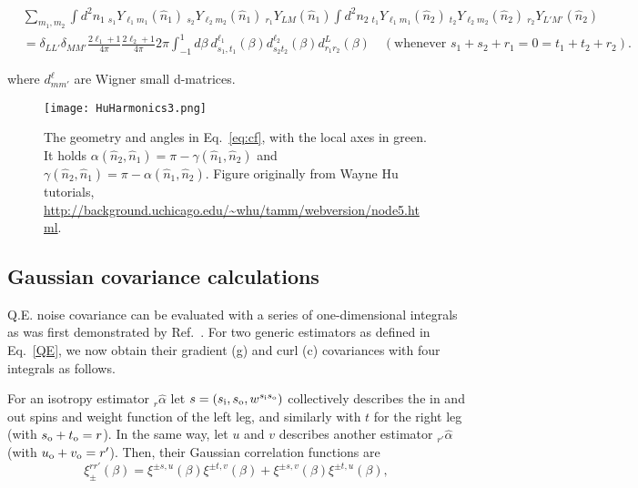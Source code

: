 \documentclass[reprint,prd, superscriptaddress, tightenlines, longbibliography, nofootinbib, eqsecnum, amsfonts, amsmath, floatfix, notitlepage, twocolumn]{revtex4-1}
\newcommand{\si}[0]{{s_{\rm i}}}
\newcommand{\so}[0]{{s_{\rm o}}}
\renewcommand{\to}[0]{{t_{\rm o}}}
\newcommand{\uo}[0]{{u_{\rm o}}}
\newcommand{\vo}[0]{{v_{\rm o}}}
\newcommand{\av}[1]{\left\langle #1 \right\rangle}
\newcommand{\hn}[0]{\hat n}
\begin{document}
\begin{widetext}
\begin{equation}
\begin{split}
&\sum_{m_1,m_2}\int d^2n_1\:_{s_1} Y_{\ell_1 m_1}(\hn_1)\:_{s_2} Y_{\ell_2 m_2}(\hn_1)\:_{r_1} Y_{L M}(\hn_1)\int d^2n_2\:_{t_1} Y_{\ell_1 m_1}(\hn_2)\:_{t_2} Y_{\ell_2 m_2}(\hn_2)\:_{r_2} Y_{L' M'}(\hn_2)  \\&= \delta_{LL'}\delta_{MM'}\frac{2\ell_1 + 1}{4\pi}\frac{2\ell_2 + 1} {4\pi} 2\pi \int_{-1}^{1} d\beta \: d^{\ell_1}_{s_1,t_1}(\beta)d^{\ell_2}_{s_2 t_2}(\beta)d^{L}_{r_1 r_2}(\beta) \quad (\textrm{whenever } s_1 + s_2 + r_1  = 0 = t_1 + t_2 + r_2).
\end{split}
\end{equation}
\end{widetext}
where $d^\ell_{mm'}$ are Wigner small d-matrices.
\begin{figure}[h]
	\texttt{[image: HuHarmonics3.png]}
	\caption{\label{fig:geometry}The geometry and angles in Eq.~\eqref{eq:cf}, with the local axes in green. It holds $\alpha(\hn_2, \hn_1) = \pi - \gamma(\hn_1, \hn_2)$ and $ \gamma(\hn_2, \hn_1) = \pi - \alpha(\hn_1, \hn_2)$. Figure originally from Wayne Hu tutorials, \url{http://background.uchicago.edu/~whu/tamm/webversion/node5.html}.}
\end{figure}
\subsection{Gaussian covariance calculations}
Q.E. noise covariance can be evaluated with a series of one-dimensional integrals as was first demonstrated by Ref.~\cite{}. For two generic estimators as defined in Eq.~\eqref{QE}, we now obtain their gradient (g) and curl (c) covariances with four integrals as follows.

For an isotropy estimator $_{r}\hat \alpha$ let $s = (\si, \so, w^{\si\so})$ collectively describes the in and out spins and weight function of the left leg, and similarly with $t$ for the right leg (with $\so + \to = r$). In the same way, let $u$ and $v$ describes another estimator $_{r'}\hat \alpha$ (with $\uo + \vo = r'$). Then, their Gaussian correlation functions are
\begin{equation}\boxed{
	\xi^{rr'}_{\pm}(\beta) = \xi^{\pm s, u}(\beta) \xi^{\pm t, v}(\beta) +  \xi^{\pm s, v}(\beta) \xi^{\pm t, u}(\beta)},
\end{equation}

\end{document}
